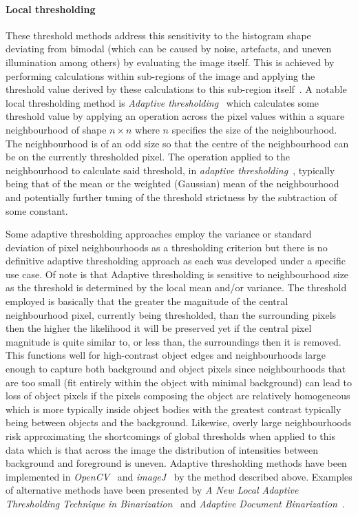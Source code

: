 \paragraph{Local thresholding}
These threshold methods address this sensitivity to the histogram shape deviating from bimodal (which can be caused by noise, artefacts, and uneven illumination among others) by evaluating the image itself. This is achieved by performing calculations within sub-regions of the image and applying the threshold value derived by these calculations to this sub-region itself~\cite[p. 72]{bioimage_book}. A notable local thresholding method is \textit{Adaptive thresholding}~\cite[p.162]{segmentation_book} which calculates some threshold value by applying an operation across the pixel values within a square neighbourhood of shape $n\times n$ where $n$ specifies the size of the neighbourhood. The neighbourhood is of an odd size so that the centre of the neighbourhood can be on the currently thresholded pixel. The operation applied to the neighbourhood to calculate said threshold, in \textit{adaptive thresholding}~\cite{adaptive_thresh_plugin}, typically being that of the mean or the weighted (Gaussian) mean of the neighbourhood and potentially further tuning of the threshold strictness by the subtraction of some constant.\par Some adaptive thresholding approaches employ the variance or standard deviation of pixel neighbourhoods as a thresholding criterion but there is no definitive adaptive thresholding approach as each was developed under a specific use case. Of note is that Adaptive thresholding is sensitive to neighbourhood size as the threshold is determined by the local mean and/or variance. The threshold employed is basically that the greater the magnitude of the central neighbourhood pixel, currently being thresholded, than the surrounding pixels then the higher the likelihood it will be preserved yet if the central pixel magnitude is quite similar to, or less than, the surroundings then it is removed. This functions well for high-contrast object edges and neighbourhoods large enough to capture both background and object pixels since neighbourhoods that are too small (fit entirely within the object with minimal background) can lead to loss of object pixels if the pixels composing the object are relatively homogeneous which is more typically inside object bodies with the greatest contrast typically being between objects and the background. Likewise, overly large neighbourhoods risk approximating the shortcomings of global thresholds when applied to this data which is that across the image the distribution of intensities between background and foreground is uneven. Adaptive thresholding methods have been implemented in \textit{OpenCV}~\cite{opencv_library} and \textit{imageJ}~\cite{adaptive_thresh_plugin} by the method described above. Examples of alternative methods have been presented by \textit{A New Local Adaptive Thresholding Technique in Binarization}~\cite{Singh2012ANL} and \textit{Adaptive Document Binarization}~\cite{adapt_sauvola}. 

